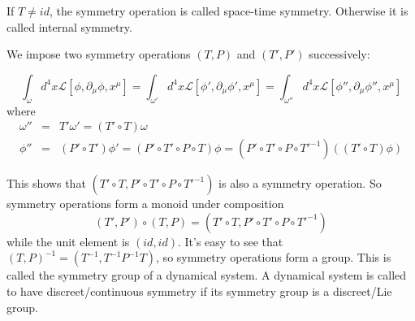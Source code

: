 \documentclass[12pt]{book}
\begin{document}
	If $T\neq id$, the symmetry operation is called space-time symmetry. Otherwise it is called internal symmetry.
	
	We impose two symmetry operations $(T,P)$ and $(T',P')$ successively:
	
	\begin{equation}
	\int_{\omega}d^4x\mathcal{L}[\phi,\partial_\mu\phi,x^\mu]=\int_{\omega'}d^4x\mathcal{L}[\phi',\partial_\mu\phi',x^\mu]=\int_{\omega''}d^4x\mathcal{L}[\phi'',\partial_\mu\phi'',x^\mu]
	\end{equation}
	where
	\begin{eqnarray}
		\omega''&=&T'\omega'=(T'\circ T)\omega\\
		\phi''&=&(P'\circ T')\phi'=(P'\circ T'\circ P\circ T)\phi=(P'\circ T'\circ P\circ T'^{-1})((T'\circ T)\phi)
	\end{eqnarray}
	
	 This shows that $(T'\circ T,P'\circ T'\circ P\circ                                                                                                                                  T'^{-1})$ is also a symmetry operation. So symmetry operations form a monoid under composition
	\begin{equation}
		(T',P')\circ(T,P)=(T'\circ T,P'\circ T'\circ P\circ T'^{-1})
	\end{equation}
	while the unit element is $(id,id)$. It's easy to see that $(T,P)^{-1}=(T^{-1},T^{-1}P^{-1}T)$, so symmetry operations form a group. This is called the symmetry group of a dynamical system. A dynamical system is called to have discreet/continuous symmetry if its symmetry group is a discreet/Lie group.
	
\end{document}
